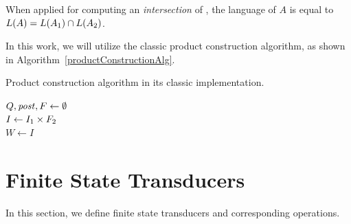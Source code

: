 When applied for computing an \emph{intersection} of \nfas, the language of $A$ is equal to $ L(A) = L(A_1) \cap L(A_2) $.

In this work, we will utilize the classic product construction algorithm, as shown in Algorithm~\ref{productConstructionAlg}.

\begin{algorithm}[ht]
\caption{Product construction algorithm in its classic implementation.}\label{productConstructionAlg}
\DontPrintSemicolon
{}
\BlankLine
$Q, \mathit{post}, F \gets \emptyset$ \\
$I \gets I_1 \times F_2$ \\
$W \gets  I$

\end{algorithm}

\section{Finite State Transducers}

In this section, we define finite state transducers and corresponding operations.


